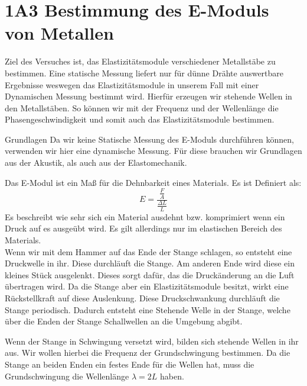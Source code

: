 \documentclass[twoside]{protokoll}
\begin{document}
 
\section{1A3 Bestimmung des E-Moduls von Metallen}

\begin{versuchsziele}
Ziel des Versuches ist, das Elastizitätsmodule verschiedener Metallstäbe zu bestimmen.
Eine statische Messung liefert nur für dünne Drähte auswertbare Ergebnisse weswegen das Elastizitätsmodule in unserem Fall mit einer Dynamischen Messung bestimmt wird. Hierfür erzeugen wir stehende Wellen in den Metallstäben. So können wir mit der Frequenz und der Wellenlänge die Phasengeschwindigkeit und somit auch das Elastizitätsmodule bestimmen. 
\end{versuchsziele}

\begin{aufgabe}{Grundlagen}
    Da wir keine Statische Messung des E-Moduls durchführen können, verwenden wir hier eine dynamische Messung.
    Für diese brauchen wir Grundlagen aus der Akustik, als auch aus der Elastomechanik.


    Das E-Modul ist ein Maß für die Dehnbarkeit eines Materials. Es ist Definiert als: 
    \begin{equation}
        E = \frac{\frac{F}{A}}{\frac{\Delta L}{L}}
    \end{equation}
    Es beschreibt wie sehr sich ein Material ausdehnt bzw. komprimiert wenn ein Druck auf es ausgeübt wird.
    Es gilt allerdings nur im elastischen Bereich des Materials.\\
    
    Wenn wir mit dem Hammer auf das Ende der Stange schlagen, so entsteht eine Druckwelle in ihr.
    Diese durchläuft die Stange. Am anderen Ende wird diese ein kleines Stück ausgelenkt.
    Dieses sorgt dafür, das die Druckänderung an die Luft übertragen wird.
    Da die Stange aber ein Elastizitätsmodule besitzt, wirkt eine Rückstellkraft auf diese Auslenkung.
    Diese Druckschwankung durchläuft die Stange periodisch.
    Dadurch entsteht eine Stehende Welle in der Stange, welche über die Enden der Stange Schallwellen an die Umgebung abgibt.

    Wenn der Stange in Schwingung versetzt wird, bilden sich stehende Wellen in ihr aus.
    Wir wollen hierbei die Frequenz der Grundschwingung bestimmen.
    Da die Stange an beiden Enden ein festes Ende für die Wellen hat, muss die Grundschwingung die Wellenlänge $\lambda = 2 L$ haben. 
     

\end{aufgabe}
\end{document}
